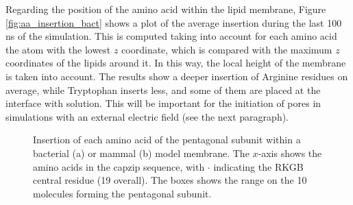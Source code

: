 Regarding the position of the amino acid within the lipid membrane, Figure \ref{fig:aa_insertion_bact} shows a plot of the average insertion during the last 100 ns of the simulation. This is computed taking into account for each amino acid the atom with the lowest $z$ coordinate, which is compared with the maximum $z$ coordinates of the lipids around it. In this way, the local height of the membrane is taken into account. The results show a deeper insertion of Arginine residues on average, while Tryptophan inserts less, and some of them are placed at the interface with solution. This will be important for the initiation of pores in simulations with an external electric field (see the next paragraph).
%
\begin{figure}[t!]
\centering
{}
\caption[Insertion of capzip amino acid in model membranes (atomistic)]{Insertion of each amino acid of the pentagonal subunit within a bacterial (a) or mammal (b) model membrane. The $x$-axis shows the amino acids in the capzip sequence, with $\cdot$ indicating the RKGB central residue (19 overall). The boxes shows the range on the 10 molecules forming the pentagonal subunit.}
\label{fig:aa_insertion}
\end{figure}

